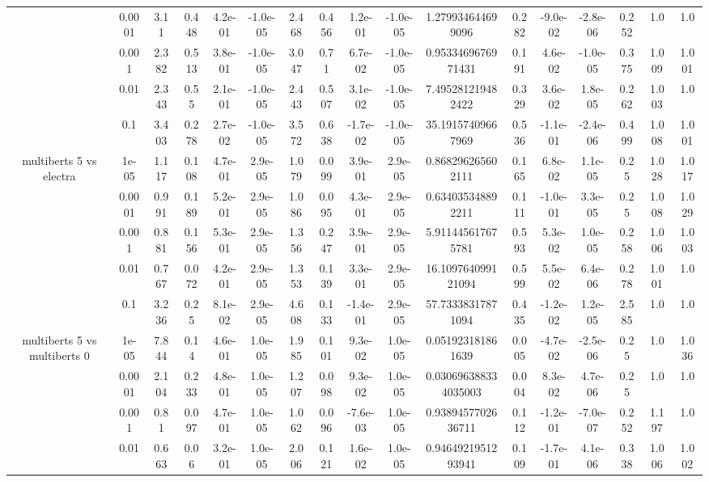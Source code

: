 \begin{tabular}{|c|c|c|c|c|c|c|c|c|c|c|c|c|c|c|c|c|}
 & 0.0001 & 3.11 & 0.448 & 4.2e-01 & -1.0e-05 & 2.468 & 0.456 & 1.2e-01 & -1.0e-05 & 1.279934644699096 & 0.282 & -9.0e-02 & -2.8e-06 & 0.252 & 1.0 & 1.0 \\
 & 0.001 & 2.382 & 0.513 & 3.8e-01 & -1.0e-05 & 3.047 & 0.71 & 6.7e-02 & -1.0e-05 & 0.9533469676971431 & 0.191 & 4.6e-02 & -1.0e-05 & 0.375 & 1.009 & 1.001 \\
 & 0.01 & 2.343 & 0.55 & 2.1e-01 & -1.0e-05 & 2.443 & 0.507 & 3.1e-02 & -1.0e-05 & 7.495281219482422 & 0.329 & 3.6e-02 & 1.8e-05 & 0.262 & 1.003 & 1.0 \\
 & 0.1 & 3.403 & 0.278 & 2.7e-02 & -1.0e-05 & 3.572 & 0.638 & -1.7e-02 & -1.0e-05 & 35.19157409667969 & 0.536 & -1.1e-01 & -2.4e-06 & 0.499 & 1.008 & 1.001 \\
\hline
\multirow{5}{*}{multiberts 5 vs electra } & 1e-05 & 1.117 & 0.108 & 4.7e-01 & 2.9e-05 & 1.079 & 0.099 & 3.9e-01 & 2.9e-05 & 0.868296265602111 & 0.165 & 6.8e-02 & 1.1e-05 & 0.25 & 1.028 & 1.017 \\
 & 0.0001 & 0.991 & 0.189 & 5.2e-01 & 2.9e-05 & 1.086 & 0.095 & 4.3e-01 & 2.9e-05 & 0.634035348892211 & 0.111 & -1.0e-01 & 3.3e-05 & 0.25 & 1.008 & 1.029 \\
 & 0.001 & 0.881 & 0.156 & 5.3e-01 & 2.9e-05 & 1.356 & 0.247 & 3.9e-01 & 2.9e-05 & 5.911445617675781 & 0.593 & 5.3e-02 & 1.0e-05 & 0.258 & 1.006 & 1.003 \\
 & 0.01 & 0.767 & 0.072 & 4.2e-01 & 2.9e-05 & 1.353 & 0.139 & 3.3e-01 & 2.9e-05 & 16.109764099121094 & 0.599 & 5.5e-02 & 6.4e-06 & 0.278 & 1.001 & 1.0 \\
 & 0.1 & 3.236 & 0.25 & 8.1e-02 & 2.9e-05 & 4.608 & 0.133 & -1.4e-01 & 2.9e-05 & 57.73338317871094 & 0.435 & -1.2e-02 & 1.2e-05 & 2.585 & 1.0 & 1.0 \\
\hline
\multirow{5}{*}{multiberts 5 vs multiberts 0} & 1e-05 & 7.844 & 0.14 & 4.6e-01 & 1.0e-05 & 1.985 & 0.101 & 9.3e-02 & 1.0e-05 & 0.051923181861639 & 0.005 & -4.7e-02 & -2.5e-06 & 0.25 & 1.0 & 1.036 \\
 & 0.0001 & 2.104 & 0.233 & 4.8e-01 & 1.0e-05 & 1.207 & 0.098 & 9.3e-02 & 1.0e-05 & 0.030696388334035003 & 0.004 & 8.3e-02 & 4.7e-06 & 0.25 & 1.0 & 1.0 \\
 & 0.001 & 0.81 & 0.097 & 4.7e-01 & 1.0e-05 & 1.062 & 0.096 & -7.6e-03 & 1.0e-05 & 0.9389457702636711 & 0.112 & -1.2e-01 & -7.0e-07 & 0.252 & 1.197 & 1.0 \\
 & 0.01 & 0.663 & 0.06 & 3.2e-01 & 1.0e-05 & 2.006 & 0.121 & 1.6e-02 & 1.0e-05 & 0.9464921951293941 & 0.109 & -1.7e-01 & 4.1e-06 & 0.338 & 1.006 & 1.002 \\

\end{tabular}
